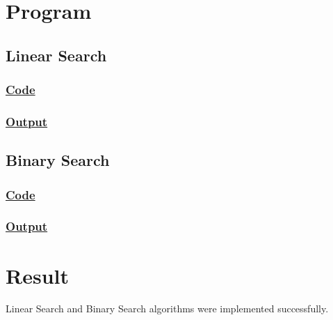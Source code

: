 \section{Program}

\subsection{Linear Search}

\subsubsection{\underline{Code}}



\subsubsection{\underline{Output}}



\subsection{Binary Search}

\subsubsection{\underline{Code}}



\subsubsection{\underline{Output}}



\vfill

\section{Result}
{\Large\color{white}
Linear Search and Binary Search algorithms were implemented successfully.
\color{black}}

\clearpage
